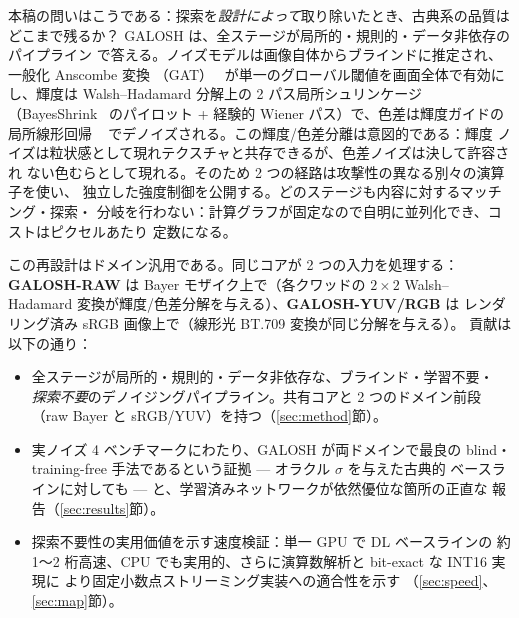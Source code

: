 \documentclass[10pt,twocolumn]{article}
\begin{document}
本稿の問いはこうである：探索を\emph{設計によって}取り除いたとき、古典系の品質は
どこまで残るか？ GALOSH は、全ステージが局所的・規則的・データ非依存のパイプライン
で答える。ノイズモデルは画像自体からブラインドに推定され、一般化 Anscombe 変換
（GAT）~\cite{foi} が単一のグローバル閾値を画面全体で有効にし、輝度は
Walsh--Hadamard 分解上の 2 パス局所シュリンケージ（BayesShrink~\cite{bayesshrink}
のパイロット + 経験的 Wiener パス）で、色差は輝度ガイドの局所線形回帰
~\cite{loess,kopf} でデノイズされる。この輝度/色差分離は意図的である：輝度
ノイズは粒状感として現れテクスチャと共存できるが、色差ノイズは決して許容され
ない色むらとして現れる。そのため 2 つの経路は攻撃性の異なる別々の演算子を使い、
独立した強度制御を公開する。どのステージも内容に対するマッチング・探索・
分岐を行わない：計算グラフが固定なので自明に並列化でき、コストはピクセルあたり
定数になる。

この再設計はドメイン汎用である。同じコアが 2 つの入力を処理する：
\textbf{GALOSH-RAW} は Bayer モザイク上で（各クワッドの $2{\times}2$
Walsh--Hadamard 変換が輝度/色差分解を与える）、\textbf{GALOSH-YUV/RGB} は
レンダリング済み sRGB 画像上で（線形光 BT.709 変換が同じ分解を与える）。
貢献は以下の通り：
\begin{itemize}\itemsep2pt
\item 全ステージが局所的・規則的・データ非依存な、ブラインド・学習不要・
\emph{探索不要}のデノイジングパイプライン。共有コアと 2 つのドメイン前段
（raw Bayer と sRGB/YUV）を持つ（\ref{sec:method}節）。
\item 実ノイズ 4 ベンチマークにわたり、GALOSH が両ドメインで最良の blind・
training-free 手法であるという証拠 --- オラクル $\sigma$ を与えた古典的
ベースラインに対しても --- と、学習済みネットワークが依然優位な箇所の正直な
報告（\ref{sec:results}節）。
\item 探索不要性の実用価値を示す速度検証：単一 GPU で DL ベースラインの
約 1〜2 桁高速、CPU でも実用的、さらに演算数解析と bit-exact な INT16 実現に
より固定小数点ストリーミング実装への適合性を示す
（\ref{sec:speed}、\ref{sec:map}節）。
\end{itemize}

\end{document}
